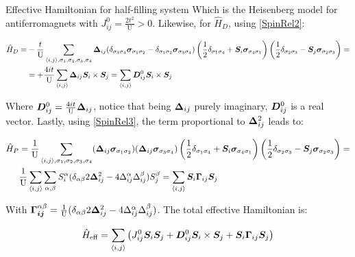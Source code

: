 \begin{section}{Effective Hamiltonian for half-filling system}
Which is the Heisenberg model for antiferromagnets with $J_{ij}^0 = \frac{2t^2}{\text{U}} > 0$. Likewise, for $\hat{H}_D$, using \ref{SpinRel2}:

\begin{align*}
\hat{H}_D = &-\frac{t}{\text{U}} \sum_{\langle i,j \rangle, \sigma_1, \sigma_2, \sigma_3, \sigma_4}\boldsymbol{\Delta}_{ij}(\delta_{\sigma_3 \sigma_4}\boldsymbol{\sigma}_{\sigma_1 \sigma_2} - \delta_{\sigma_1 \sigma_2} \boldsymbol{\sigma}_{\sigma_3\sigma_4})\left(\frac{1}{2}\delta_{\sigma_1 \sigma_4} + \boldsymbol{S}_i\boldsymbol{\sigma}_{\sigma_4 \sigma_1}\right)\left(\frac{1}{2}\delta_{\sigma_2 \sigma_3}-\boldsymbol{S}_j\boldsymbol{\sigma}_{\sigma_2 \sigma_3}\right) = \\
&= +\frac{4it}{\text{U}} \sum_{\langle i,j \rangle} \boldsymbol{\Delta}_{ij} \boldsymbol{S}_i \times \boldsymbol{S}_j = \sum_{\langle i,j \rangle} \boldsymbol{D}_{ij}^0 \boldsymbol{S}_i \times \boldsymbol{S}_j
\end{align*}

Where $\boldsymbol{D}_{ij}^0 = \frac{4it}{\text{U}}\boldsymbol{\Delta}_{ij}$, notice that being $\boldsymbol{\Delta}_{ij}$ purely imaginary, $\boldsymbol{D}_{ij}^0$ is a real vector. 
Lastly, using \ref{SpinRel3}, the term proportional to $\boldsymbol{\Delta}_{ij}^2$ leads to:

\begin{align*}
\hat{H}_P &= \frac{1}{\text{U}}\sum_{\langle i,j \rangle, \sigma_1, \sigma_2, \sigma_3, \sigma_4} (\boldsymbol{\Delta}_{ij}\boldsymbol{\sigma}_{\sigma_1 \sigma_2})(\boldsymbol{\Delta}_{ij} \boldsymbol{\sigma}_{\sigma_3 \sigma_4}) \left(\frac{1}{2}\delta_{\sigma_1 \sigma_4} + \boldsymbol{S}_i\boldsymbol{\sigma}_{\sigma_4 \sigma_1}\right)\left(\frac{1}{2}\delta_{\sigma_2 \sigma_3}-\boldsymbol{S}_j\boldsymbol{\sigma}_{\sigma_2 \sigma_3}\right) = \\
&\frac{1}{\text{U}} \sum_{\langle i,j \rangle} \sum_{\alpha, \beta} S_i^\alpha (\delta_{\alpha \beta} 2\boldsymbol{\Delta}_{ij}^2 - 4\Delta_{ij}^\alpha\Delta_{ij}^\beta ) S_j^\beta = \sum_{\langle i,j \rangle} \boldsymbol{S}_i \boldsymbol{\Gamma}_{ij} \boldsymbol{S}_j
\end{align*}

With $\boldsymbol{\Gamma_{ij}}^{\alpha \beta} = \frac{1}{\text{U}}(\delta_{\alpha \beta} 2\boldsymbol{\Delta}_{ij}^2 - 4\Delta_{ij}^\alpha\Delta_{ij}^\beta)$.
The total effective Hamiltonian is:

\begin{equation}
\hat{H}_{\text{eff}} = \sum_{\langle i,j \rangle} \left( J_{ij}^0 \boldsymbol{S}_i\boldsymbol{S}_j + \boldsymbol{D}_{ij}^0 \boldsymbol{S}_i \times \boldsymbol{S}_j + \boldsymbol{S}_i \boldsymbol{\Gamma}_{ij} \boldsymbol{S}_j \right) \label{HeffNOEMF}
\end{equation}


\end{section}
